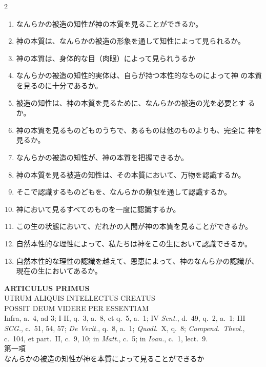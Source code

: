 \documentclass[paper=a4paper,fontsize=10pt,jafontsize=9pt,titlepage]{jlreq}
\begin{document}
\begin{paracol}{2}
\begin{enumerate}
\end{enumerate}

\switchcolumn

\begin{enumerate}
 \item なんらかの被造の知性が神の本質を見ることができるか。
 \item 神の本質は、なんらかの被造の形象を通して知性によって見られるか。
 \item 神の本質は、身体的な目（肉眼）によって見られうるか
 \item なんらかの被造の知性的実体は、自らが持つ本性的なものによって神
       の本質を見るのに十分であるか。
 \item 被造の知性は、神の本質を見るために、なんらかの被造の光を必要とす
       るか。
 \item 神の本質を見るものどものうちで、あるものは他のものよりも、完全に
       神を見るか。
 \item なんらかの被造の知性が、神の本質を把握できるか。
 \item 神の本質を見る被造の知性は、その本質において、万物を認識するか。
 \item そこで認識するものどもを、なんらかの類似を通して認識するか。
 \item 神において見るすべてのものを一度に認識するか。
 \item この生の状態において、だれかの人間が神の本質を見ることができるか。
 \item 自然本性的な理性によって、私たちは神をこの生において認識できるか。
 \item 自然本性的な理性の認識を越えて、恩恵によって、神のなんらかの認識が、
       現在の生においてあるか。
\end{enumerate}

\end{paracol}

\newpage


\begin{center}
{\Large {\bfseries ARTICULUS PRIMUS}}\\
{\large UTRUM ALIQUIS INTELLECTUS CREATUS\\ POSSIT DEUM VIDERE PER
 ESSENTIAM}\\
{\footnotesize Infra, a.~4, ad 3; I-II, q.~3, a.~8, et q.~5, a.~1; IV
 {\itshape Sent.}, d.~49, q.~2, a.~1; III {\itshape SCG.}, c.~51, 54,
 57; {\itshape De Verit.}, q.~8, a.~1; {\itshape Quodl.}~X, q.~8;
 {\itshape Compend.~Theol.}, c.~104, et part.~II, c.~9, 10; in {\itshape
 Matt.}, c.~5; in {\itshape Ioan.}, c.~1, lect.~9.}\\
{\Large 第一項\\なんらかの被造の知性が神を本質によって見ることができるか}
\end{center}
\end{document}

